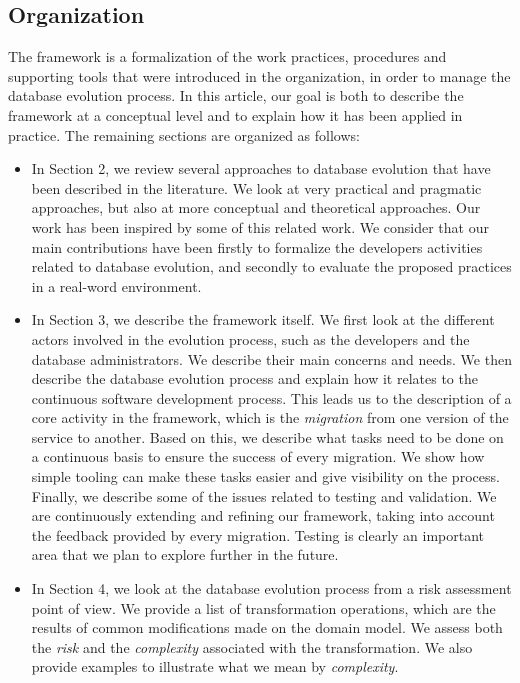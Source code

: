 \subsection{Organization}

The framework is a formalization of the work practices, procedures and supporting tools that were introduced in the organization, in order to manage the database evolution process. In this article, our goal is both to describe the framework at a conceptual level and to explain how it has been applied in practice. The remaining sections are organized as follows:

\begin{itemize}
\item In Section 2, we review several approaches to database evolution that have been described in the literature. We look at very practical and pragmatic approaches, but also at more conceptual and theoretical approaches. Our work has been inspired by some of this related work. We consider that our main contributions have been firstly to formalize the developers activities related to database evolution, and secondly to evaluate the proposed practices in a real-word environment.

\item In Section 3, we describe the framework itself. We first look at the different actors involved in the evolution process, such as the developers and the database administrators. We describe their main concerns and needs. We then describe the database evolution process and explain how it relates to the continuous software development process. This leads us to the description of a core activity in the framework, which is the \emph{migration} from one version of the service to another. Based on this, we describe what tasks need to be done on a continuous basis to ensure the success of every migration. We show how simple tooling can make these tasks easier and give visibility on the process. Finally, we describe some of the issues related to testing and validation. We are continuously extending and refining our framework, taking into account the feedback provided by every migration. Testing is clearly an important area that we plan to explore further in the future.

\item In Section 4, we look at the database evolution process from a risk assessment point of view. We provide a list of transformation operations, which are the results of common modifications made on the domain model. We assess both the \emph{risk} and the \emph{complexity} associated with the transformation. We also provide examples to illustrate what we mean by \emph{complexity}.


\end{itemize}
